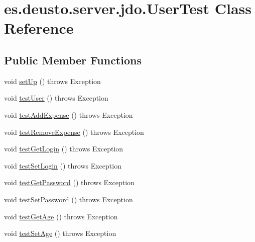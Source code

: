 \hypertarget{classes_1_1deusto_1_1server_1_1jdo_1_1_user_test}{}\section{es.\+deusto.\+server.\+jdo.\+User\+Test Class Reference}
\label{classes_1_1deusto_1_1server_1_1jdo_1_1_user_test}
\subsection*{Public Member Functions}
\begin{DoxyCompactItemize}
\item 
void \hyperlink{classes_1_1deusto_1_1server_1_1jdo_1_1_user_test_ae4f4cc3f32659a36b3c5853d7789ccc5}{set\+Up} ()  throws Exception 
\item 
void \hyperlink{classes_1_1deusto_1_1server_1_1jdo_1_1_user_test_a3e1ca2f6eb28866bbbf7568638f035e8}{test\+User} ()  throws Exception 
\item 
void \hyperlink{classes_1_1deusto_1_1server_1_1jdo_1_1_user_test_a60b10702d0f2d5b45895ce6bccd1d89e}{test\+Add\+Expense} ()  throws Exception 
\item 
void \hyperlink{classes_1_1deusto_1_1server_1_1jdo_1_1_user_test_acc8ecd1dc930429a2247c34047f4b66d}{test\+Remove\+Expense} ()  throws Exception 
\item 
void \hyperlink{classes_1_1deusto_1_1server_1_1jdo_1_1_user_test_a5620fe8a855002a48cdc5b260491ef8f}{test\+Get\+Login} ()  throws Exception 
\item 
void \hyperlink{classes_1_1deusto_1_1server_1_1jdo_1_1_user_test_abc3bb7420be9628bc36ef599e8d8ee18}{test\+Set\+Login} ()  throws Exception 
\item 
void \hyperlink{classes_1_1deusto_1_1server_1_1jdo_1_1_user_test_a81ad692662774db5d47e857d45320e2b}{test\+Get\+Password} ()  throws Exception 
\item 
void \hyperlink{classes_1_1deusto_1_1server_1_1jdo_1_1_user_test_a03e1fab080aa109c4df4985c370934c8}{test\+Set\+Password} ()  throws Exception 
\item 
void \hyperlink{classes_1_1deusto_1_1server_1_1jdo_1_1_user_test_a13dfa5e5c4795b59612fbea70ba5f3af}{test\+Get\+Age} ()  throws Exception 
\item 
void \hyperlink{classes_1_1deusto_1_1server_1_1jdo_1_1_user_test_ac45f9cf087026405559dab8de89f1d66}{test\+Set\+Age} ()  throws Exception 
\item 

\end{DoxyCompactItemize}
